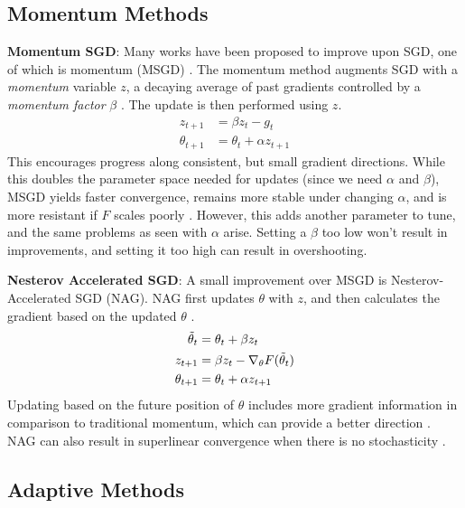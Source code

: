 \subsection{Momentum Methods} \label{sec:momentum}
\textbf{Momentum SGD}: Many works have been proposed to improve upon SGD, one of which is momentum (MSGD) \citep{polyak1964some}. The momentum method augments SGD with a \textit{momentum} variable $z$, a decaying average of past gradients controlled by a \textit{momentum factor} $\beta$ \citep{polyak1964some, henriques2019small}. The update is then performed using $z$. 
\begin{align}
    z_{t+1} &= \beta z_{t} - g_t \\
    \theta_{t+1} &= \theta_t + \alpha z_{t+1}
\end{align}
This encourages progress along consistent, but small gradient directions. While this doubles the parameter space needed for updates (since we need $\alpha$ and $\beta$), MSGD yields faster convergence, remains more stable under changing $\alpha$, and is more resistant if $F$ scales poorly \citep{polyak1964some,henriques2019small}. However, this adds another parameter to tune, and the same problems as seen with $\alpha$ arise. Setting a $\beta$ too low won't result in improvements, and setting it too high can result in overshooting.

\textbf{Nesterov Accelerated SGD}: A small improvement over MSGD is Nesterov-Accelerated SGD (NAG). NAG first updates $\theta$ with $z$, and then calculates the gradient based on the updated $\theta$ \citep{nesterov1983method, sutskever2013importance}.
\begin{align}
    \Tilde{\theta}_{t} &= \theta_{t} + \beta z_{t} \\
    z_{t+1} &= \beta z_t - \nabla_{\theta} F(\Tilde{\theta}_{t}) \\
    \theta_{t+1} &= \theta_{t} + \alpha z_{t+1}
\end{align}
Updating based on the future position of $\theta$ includes more gradient information in comparison to traditional momentum, which can provide a better direction \citep{nesterov1983method, dozat2016nadam}. NAG can also result in superlinear convergence when there is no stochasticity \citep{nesterov1983method, sutskever2013importance}.

\subsection{Adaptive Methods}

